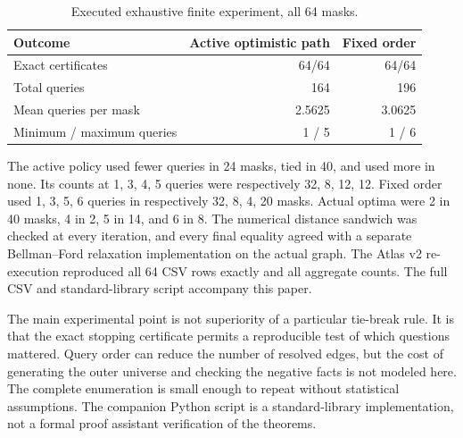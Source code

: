 \documentclass[11pt]{article}
\theoremstyle{definition}\newtheorem{definition}[theorem]{Definition}\newtheorem{example}[theorem]{Example}\newtheorem{conjecture}[theorem]{Conjecture}
\begin{document}
\begin{table}[ht]\centering
\begin{tabular}{lrr}\toprule Outcome & Active optimistic path & Fixed order\\\midrule
Exact certificates &64/64&64/64\\
Total queries &164&196\\
Mean queries per mask &2.5625&3.0625\\
Minimum / maximum queries &1 / 5&1 / 6\\
\bottomrule\end{tabular}
\caption{Executed exhaustive finite experiment, all 64 masks.}\end{table}
The active policy used fewer queries in 24 masks, tied in 40, and used more in none. Its counts at 1, 3, 4, 5 queries were respectively 32, 8, 12, 12. Fixed order used 1, 3, 5, 6 queries in respectively 32, 8, 4, 20 masks. Actual optima were 2 in 40 masks, 4 in 2, 5 in 14, and 6 in 8. The numerical distance sandwich was checked at every iteration, and every final equality agreed with a separate Bellman--Ford relaxation implementation on the actual graph. The Atlas v2 re-execution reproduced all 64 CSV rows exactly and all aggregate counts. The full CSV and standard-library script accompany this paper.

The main experimental point is not superiority of a particular tie-break rule. It is that the exact stopping certificate permits a reproducible test of which questions mattered. Query order can reduce the number of resolved edges, but the cost of generating the outer universe and checking the negative facts is not modeled here. The complete enumeration is small enough to repeat without statistical assumptions. The companion Python script is a standard-library implementation, not a formal proof assistant verification of the theorems.
\end{document}
